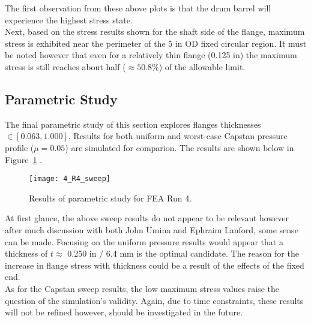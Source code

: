 The first observation from these above plots is that the drum barrel will experience the highest stress state.\\

Next, based on the stress results shown for the shaft side of the flange, maximum stress is exhibited near the perimeter of the 5 in OD fixed circular region. It must be noted however that even for a relatively thin flange (0.125 in) the maximum stress is still reaches about half ($\approx 50.8\%$) of the allowable limit.

\subsection{Parametric Study}

The final parametric study of this section explores flanges thicknesses $\in [0.063, 1.000]$. Results for both uniform and worst-case Capstan pressure profile ($\mu=0.05$) are simulated for comparion. The results are shown below in Figure~\ref{fig:4_R4_sweep} \cite{EXCEL}.

\begin{figure}[H]
	\centering
	\texttt{[image: 4\_R4\_sweep]}
	\caption{Results of parametric study for FEA Run 4.}
	\label{fig:4_R4_sweep}
\end{figure}

At first glance, the above sweep results do not appear to be relevant however after much discussion with both John Umina and Ephraim Lanford, some sense can be made. Focusing on the uniform pressure results would appear that a thickness of $t\approx$ 0.250 in / 6.4 mm  is the optimal candidate. The reason for the increase in flange stress with thickness could be a result of the effects of the fixed end.\\

As for the Capstan sweep results, the low maximum stress values raise the question of the simulation's validity. Again, due to time constraints, these results will not be refined however, should be investigated in the future.

